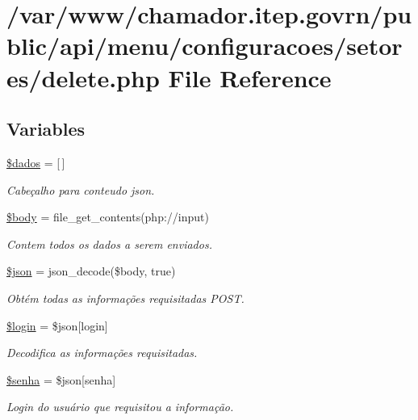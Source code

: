 \hypertarget{setores_2delete_8php}{}\section{/var/www/chamador.itep.\+govrn/public/api/menu/configuracoes/setores/delete.php File Reference}
\label{setores_2delete_8php}
\subsection*{Variables}
\begin{DoxyCompactItemize}
\item 
\hyperlink{setores_2delete_8php_a252370d95039a38fa11afab784725d58}{\$dados} = \mbox{[}$\,$\mbox{]}
\begin{DoxyCompactList}\small\item\em Cabeçalho para conteudo json. \end{DoxyCompactList}\item 
\hyperlink{setores_2delete_8php_a26b9f9373f7bb79dfcf8a86dff086b45}{\$body} = file\+\_\+get\+\_\+contents(\textquotesingle{}php\+://input\textquotesingle{})
\begin{DoxyCompactList}\small\item\em Contem todos os dados a serem enviados. \end{DoxyCompactList}\item 
\hyperlink{setores_2delete_8php_acedd13b51401130848ce18f4d5c52605}{\$json} = json\+\_\+decode(\$body, true)
\begin{DoxyCompactList}\small\item\em Obtém todas as informações requisitadas P\+O\+ST. \end{DoxyCompactList}\item 
\hyperlink{setores_2delete_8php_afc31993e855f9631572adfedcfe6f34b}{\$login} = \$json\mbox{[}\textquotesingle{}login\textquotesingle{}\mbox{]}
\begin{DoxyCompactList}\small\item\em Decodifica as informações requisitadas. \end{DoxyCompactList}\item 
\hyperlink{setores_2delete_8php_a3678c8769c9698fd30581c1016c5f475}{\$senha} = \$json\mbox{[}\textquotesingle{}senha\textquotesingle{}\mbox{]}
\begin{DoxyCompactList}\small\item\em Login do usuário que requisitou a informação. \end{DoxyCompactList}\item 

\end{DoxyCompactItemize}
